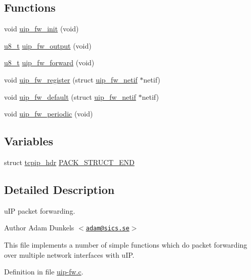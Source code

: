 \subsection*{Functions}
\begin{DoxyCompactItemize}
\item 
void \hyperlink{group__uipfw_ga0c90f476e0557afaee479c61d4d3eaf3}{uip\_\-fw\_\-init} (void)
\item 
\hyperlink{group__uipfw_ga4caecabca98b43919dd11be1c0d4cd8e}{u8\_\-t} \hyperlink{group__uipfw_gabc6fe2d1544b0a16ee3f3fc1c1ccf93a}{uip\_\-fw\_\-output} (void)
\item 
\hyperlink{group__uipfw_ga4caecabca98b43919dd11be1c0d4cd8e}{u8\_\-t} \hyperlink{group__uipfw_ga208866aad58f1fb9d5f9e37713f9f4e5}{uip\_\-fw\_\-forward} (void)
\item 
void \hyperlink{group__uipfw_gaa2d5cfe32c9ec743e956c4e19dcee21a}{uip\_\-fw\_\-register} (struct \hyperlink{structuip__fw__netif}{uip\_\-fw\_\-netif} $\ast$netif)
\item 
void \hyperlink{group__uipfw_ga94dcf0fa8bff34949a37fbde77786f82}{uip\_\-fw\_\-default} (struct \hyperlink{structuip__fw__netif}{uip\_\-fw\_\-netif} $\ast$netif)
\item 
void \hyperlink{group__uipfw_ga35ab515cdae08d65c5d080771754f62a}{uip\_\-fw\_\-periodic} (void)
\end{DoxyCompactItemize}
\subsection*{Variables}
\begin{DoxyCompactItemize}
\item 
struct \hyperlink{structtcpip__hdr}{tcpip\_\-hdr} \hyperlink{group__uipfw_gafe7e75cc45d2b325aaaf5d0042e8bfd8}{PACK\_\-STRUCT\_\-END}
\end{DoxyCompactItemize}


\subsection{Detailed Description}
uIP packet forwarding. \begin{DoxyAuthor}{Author}
Adam Dunkels $<$\href{mailto:adam@sics.se}{\tt adam@sics.se}$>$
\end{DoxyAuthor}
This file implements a number of simple functions which do packet forwarding over multiple network interfaces with uIP. 

Definition in file \hyperlink{uip-fw_8c_source}{uip-\/fw.c}.

